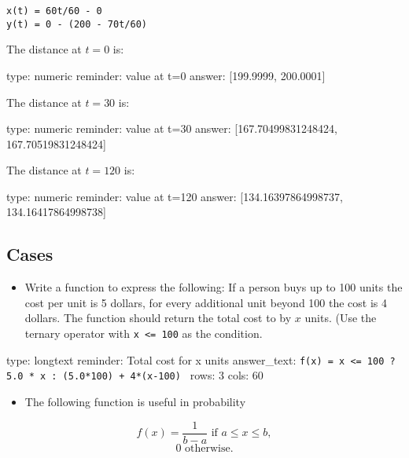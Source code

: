 \documentclass[12pt]{article}
\begin{document}
\begin{verbatim}
x(t) = 60t/60 - 0
y(t) = 0 - (200 - 70t/60)
\end{verbatim}
The distance at $t=0$ is:

\begin{answer}
    type: numeric
    reminder: value at t=0
    answer: [199.9999, 200.0001]

\end{answer}

The distance at $t=30$ is:

\begin{answer}
    type: numeric
    reminder: value at t=30
    answer: [167.70499831248424, 167.70519831248424]

\end{answer}

The distance at $t=120$ is:

\begin{answer}
    type: numeric
    reminder: value at t=120
    answer: [134.16397864998737, 134.16417864998738]

\end{answer}

\subsection{Cases}

\begin{itemize}
\itemsep1pt\parskip0pt
\item
  Write a function to express the following: If a person buys up to 100
  units the cost per unit is 5 dollars, for every additional unit beyond
  100 the cost is 4 dollars. The function should return the total cost
  to by $x$ units. (Use the ternary operator with
  \texttt{x \textless{}= 100} as the condition.
\end{itemize}

\begin{answer}
type: longtext
reminder: Total cost for x units
answer_text: \verb#f(x) = x <= 100 ? 5.0 * x : (5.0*100) + 4*(x-100) # 
rows: 3
cols: 60
\end{answer}

\begin{itemize}
\itemsep1pt\parskip0pt
\item
  The following function is useful in probability
\end{itemize}

\[
f(x)= \frac{1}{b-a} \text{ if } a \leq x \leq b, 
\] \[
0  \text{ otherwise.}
\]
\end{document}
